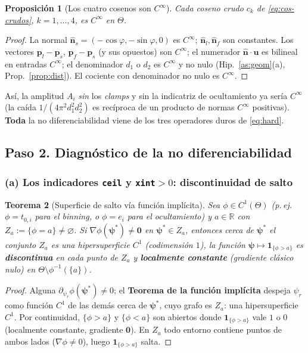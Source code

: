 \documentclass[11pt,a4paper]{article}
\theoremstyle{plain}
\newtheorem{theorem}{Teorema}
\newtheorem{proposition}[theorem]{Proposici\'on}
\theoremstyle{definition}
\newcommand{\vect}[1]{\boldsymbol{#1}}
\newcommand{\R}{\mathbb{R}}
\begin{document}
\begin{proposition}[Los cuatro cosenos son $C^\infty$]\label{prop:cos}
Cada coseno crudo $c_k$ de \eqref{eq:cos-crudos},
$k=1,\dots,4$, es $C^\infty$ en $\Theta$.
\end{proposition}
\begin{proof}
La normal $\hat{\vect n}_s=(-\cos\varphi,-\sin\varphi,0)$ es $C^\infty$;
$\hat{\vect n}_l,\hat{\vect n}_f$ son constantes. Los vectores $\vect p_l-\vect
p_s$, $\vect p_f-\vect p_s$ (y sus opuestos) son $C^\infty$; el numerador
$\hat{\vect n}\!\cdot\!\vect u$ es bilineal en entradas $C^\infty$; el denominador
$d_1$ o $d_2$ es $C^\infty$ y no nulo (Hip.~\ref{as:geom}(a),
Prop.~\ref{prop:dist}). El cociente con denominador no nulo es $C^\infty$.
\end{proof}

As\'i, la amplitud $A_i$ \emph{sin} los \emph{clamps} y sin la indicatriz de
ocultamiento ya ser\'ia $C^\infty$ (la ca\'ida $1/(4\pi^2 d_1^2 d_2^2)$ es
rec\'iproca de un producto de normas $C^\infty$ positivas). \textbf{Toda} la no
diferenciabilidad viene de los tres operadores duros de \eqref{eq:hard}.

\subsection*{Paso 2. Diagn\'ostico de la no diferenciabilidad}
\label{sec:diagnostico}

\subsubsection*{(a) Los indicadores \texttt{ceil} y \texttt{xint}$>0$: discontinuidad de salto}

\begin{theorem}[Superficie de salto v\'ia funci\'on impl\'icita]\label{thm:ift}
Sea $\phi\in C^1(\Theta)$ (p.\,ej.\ $\phi=t_{0,i}$ para el binning, o
$\phi=e_i$ para el ocultamiento) y $a\in\R$ con
$Z_a:=\{\phi=a\}\neq\varnothing$. Si $\nabla\phi(\vect{\psi}^\ast)\neq\vect 0$ en
$\vect{\psi}^\ast\in Z_a$, entonces cerca de $\vect{\psi}^\ast$ el conjunto $Z_a$
es una hipersuperficie $C^1$ (codimensi\'on $1$), la funci\'on
$\vect{\psi}\mapsto\mathbf{1}_{\{\phi>a\}}$ es \textbf{discontinua} en cada punto
de $Z_a$ y \textbf{localmente constante} (gradiente cl\'asico nulo) en
$\Theta\setminus\phi^{-1}(\{a\})$.
\end{theorem}
\begin{proof}
Alguna $\partial_{\psi_r}\phi(\vect{\psi}^\ast)\neq0$; el \textbf{Teorema de la
funci\'on impl\'icita} despeja $\psi_r$ como funci\'on $C^1$ de las dem\'as cerca de
$\vect{\psi}^\ast$, cuyo grafo es $Z_a$: una hipersuperficie $C^1$. Por
continuidad, $\{\phi>a\}$ y $\{\phi<a\}$ son abiertos donde
$\mathbf 1_{\{\phi>a\}}$ vale $1$ o $0$ (localmente constante, gradiente $\vect
0$). En $Z_a$ todo entorno contiene puntos de ambos lados ($\nabla\phi\neq0$),
luego $\mathbf 1_{\{\phi>a\}}$ salta.
\end{proof}
\end{document}
